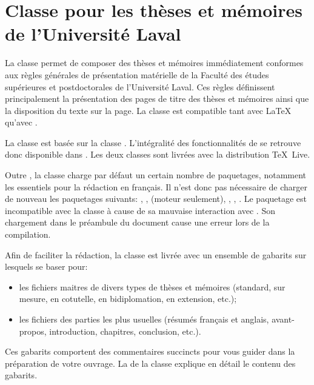 
\chapter{Classe pour les thèses et mémoires de
  l'Université Laval}
\label{chap:ulthese}

La classe  \citep{ulthese} permet de composer des
thèses et mémoires immédiatement conformes aux règles générales de
présentation matérielle de la Faculté des études supérieures et
postdoctorales de l'Université Laval. Ces règles définissent
principalement la présentation des pages de titre des thèses et
mémoires ainsi que la disposition du texte sur la page. La classe est
compatible tant avec {\LaTeX} qu'avec {\XeLaTeX}.

La classe  est basée sur la classe .
L'intégralité des fonctionnalités de  se retrouve donc
disponible dans . Les deux classes sont livrées avec la
distribution {\TeX}~Live.

Outre , la classe charge par défaut un certain nombre de
paquetages, notamment les essentiels pour la rédaction en français. Il
n'est donc pas nécessaire de charger de nouveau les paquetages
suivants: , ,  
(moteur {\XeLaTeX} seulement), , ,
. Le paquetage  est incompatible avec la
classe à cause de sa mauvaise interaction avec . Son
chargement dans le préambule du document cause une erreur lors de la
compilation.

Afin de faciliter la rédaction, la classe est livrée avec un ensemble
de gabarits sur lesquels se baser pour:
\begin{itemize}
\item les fichiers maitres de divers types de thèses et mémoires
  (standard, sur mesure, en cotutelle, en bidiplomation, en
  extension, etc.);
\item les fichiers des parties les plus usuelles (résumés français
  et anglais, avant-propos, introduction, chapitres, conclusion,
  etc.).
\end{itemize}
Ces gabarits comportent des commentaires succincts pour vous guider
dans la préparation de votre ouvrage. La
de la classe explique en détail le contenu des gabarits.

